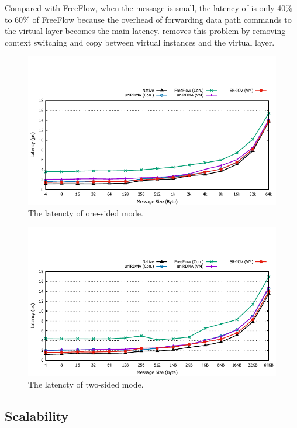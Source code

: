Compared with FreeFlow, when the message is small, the latency of \sys is only 40\% to 60\% of FreeFlow because the overhead of forwarding data path commands to the virtual layer becomes the main latency. \sys removes this problem by removing context switching and copy between virtual instances and the virtual layer.


\begin{figure}[!ht]
	\centering
	\includegraphics[width=1.0\linewidth]{images/write-lat.pdf}
	\caption{The latencty of one-sided mode.}
	\label{fig:write-lat}
\end{figure}


\begin{figure}[!ht]
	\centering
	\includegraphics[width=1.0\linewidth]{images/send-lat.pdf}
	\caption{The latencty of two-sided mode.}
	\label{fig:send-lat}
\end{figure}


\subsection{Scalability}

